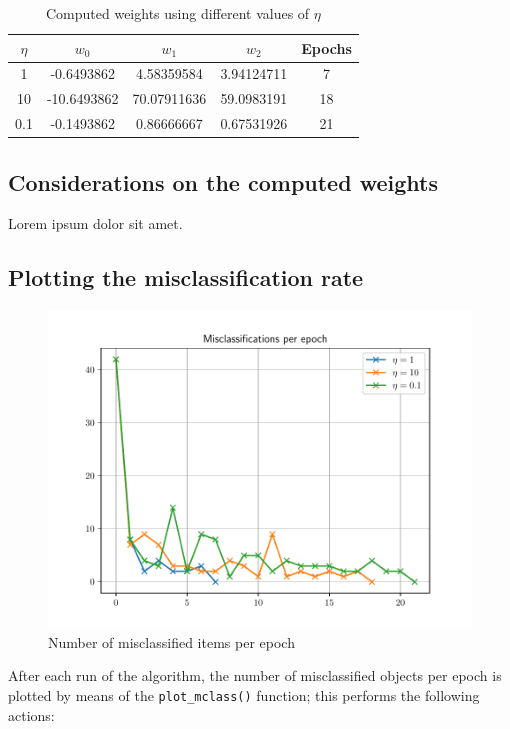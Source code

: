 \documentclass[letterpaper,headings=standardclasses]{scrartcl}
\begin{document}
\begin{table}[h]
\centering
\begin{tabular}{|c|c|c|c|c|}
\hline
$\eta$ & $w_0$       & $w_1$       & $w_2$      & Epochs \\ \hline
1      & -0.6493862  & 4.58359584  & 3.94124711 & 7      \\ \hline
10     & -10.6493862 & 70.07911636 & 59.0983191 & 18     \\ \hline
0.1    & -0.1493862  & 0.86666667  & 0.67531926 & 21     \\ \hline
\end{tabular}
\caption{Computed weights using different values of $\eta$}
\end{table}

\subsection{Considerations on the computed weights}

Lorem ipsum dolor sit amet.

\subsection{Plotting the misclassification rate}

\begin{figure}[h]
\centering
\includegraphics[width=.7\linewidth]{mclass_per_epoch.pdf}
\caption{Number of misclassified items per epoch}
\end{figure}

After each run of the algorithm, the number of misclassified objects per epoch is plotted by means of the \texttt{plot\_mclass()} function; this performs the following actions:
\end{document}
